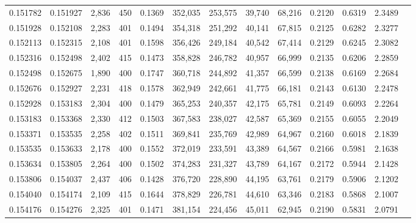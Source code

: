 \begin{tabular}{rrrrrrrrrrrrr}
0.151782 & 0.151927 & 2,836 & 450 &                                     0.1369 & 352,035 & 253,575 &  39,740 &  68,216 & 0.2120 & 0.6319 & 2.3489 \\
0.151928 & 0.152108 & 2,283 & 401 &                                     0.1494 & 354,318 & 251,292 &  40,141 &  67,815 & 0.2125 & 0.6282 & 2.3277 \\
0.152113 & 0.152315 & 2,108 & 401 &                                     0.1598 & 356,426 & 249,184 &  40,542 &  67,414 & 0.2129 & 0.6245 & 2.3082 \\
0.152316 & 0.152498 & 2,402 & 415 &                                     0.1473 & 358,828 & 246,782 &  40,957 &  66,999 & 0.2135 & 0.6206 & 2.2859 \\
0.152498 & 0.152675 & 1,890 & 400 &                                     0.1747 & 360,718 & 244,892 &  41,357 &  66,599 & 0.2138 & 0.6169 & 2.2684 \\
0.152676 & 0.152927 & 2,231 & 418 &                                     0.1578 & 362,949 & 242,661 &  41,775 &  66,181 & 0.2143 & 0.6130 & 2.2478 \\
0.152928 & 0.153183 & 2,304 & 400 &                                     0.1479 & 365,253 & 240,357 &  42,175 &  65,781 & 0.2149 & 0.6093 & 2.2264 \\
0.153183 & 0.153368 & 2,330 & 412 &                                     0.1503 & 367,583 & 238,027 &  42,587 &  65,369 & 0.2155 & 0.6055 & 2.2049 \\
0.153371 & 0.153535 & 2,258 & 402 &                                     0.1511 & 369,841 & 235,769 &  42,989 &  64,967 & 0.2160 & 0.6018 & 2.1839 \\
0.153535 & 0.153633 & 2,178 & 400 &                                     0.1552 & 372,019 & 233,591 &  43,389 &  64,567 & 0.2166 & 0.5981 & 2.1638 \\
0.153634 & 0.153805 & 2,264 & 400 &                                     0.1502 & 374,283 & 231,327 &  43,789 &  64,167 & 0.2172 & 0.5944 & 2.1428 \\
0.153806 & 0.154037 & 2,437 & 406 &                                     0.1428 & 376,720 & 228,890 &  44,195 &  63,761 & 0.2179 & 0.5906 & 2.1202 \\
0.154040 & 0.154174 & 2,109 & 415 &                                     0.1644 & 378,829 & 226,781 &  44,610 &  63,346 & 0.2183 & 0.5868 & 2.1007 \\
0.154176 & 0.154276 & 2,325 & 401 &                                     0.1471 & 381,154 & 224,456 &  45,011 &  62,945 & 0.2190 & 0.5831 & 2.0791 \\

\end{tabular}
